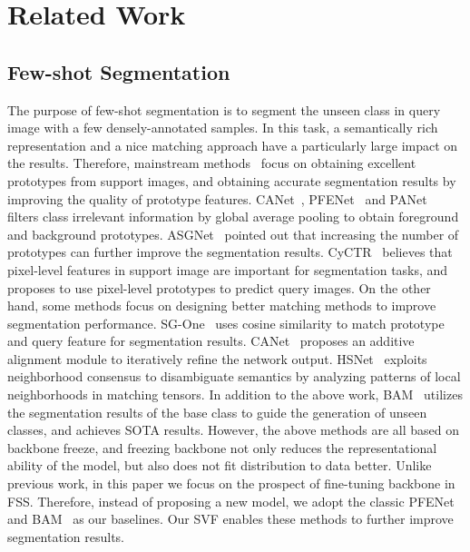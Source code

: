 \documentclass{article}
\begin{document}
\vspace{-1.2em}
 \section{Related Work}
\vspace{-.9em}
\subsection{Few-shot Segmentation}
\vspace{-.5em}
The purpose of few-shot segmentation is to segment the unseen class in query image with a few densely-annotated samples. In this task, a semantically rich representation and a nice matching approach have a particularly large impact on the results. Therefore, mainstream methods~\cite{yang2021mining, xie2021scale,snell2017prototypical,dong2018few} focus on obtaining excellent prototypes from support images, and obtaining accurate segmentation results by improving the quality of prototype features. CANet~\cite{zhang2019canet}, PFENet~\cite{tian2020prior} and PANet~\cite{wang2019panet} filters class irrelevant information by global average pooling to obtain foreground and background prototypes. ASGNet~\cite{li2021adaptive} pointed out that increasing the number of prototypes can further improve the segmentation results. CyCTR~\cite{zhang2021few} believes that pixel-level features in support image are important for segmentation tasks, and proposes to use pixel-level prototypes to predict query images. On the other hand, some methods focus on designing better matching methods to improve segmentation performance. SG-One~\cite{zhang2020sg} uses cosine similarity to match prototype and query feature for segmentation results. CANet~\cite{zhang2019canet} proposes an additive alignment module to iteratively refine the network output. HSNet~\cite{hsnet} exploits neighborhood consensus to disambiguate semantics by analyzing patterns of local neighborhoods in matching tensors. In addition to the above work, BAM~\cite{lang2022learning} utilizes the segmentation results of the base class to guide the generation of unseen classes, and achieves SOTA results. However, the above methods are all based on backbone freeze, and freezing backbone not only reduces the representational ability of the model, but also does not fit distribution to data better. Unlike previous work, in this paper we focus on the prospect of fine-tuning backbone in FSS. Therefore, instead of proposing a new model, we adopt the classic PFENet~\cite{tian2020prior} and BAM~\cite{lang2022learning} as our baselines. Our SVF enables these methods to further improve segmentation results.
\vspace{-.6em}
\end{document}

